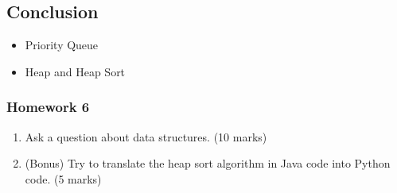 \documentclass[aspectratio=169, 14pt]{beamer}
\begin{document}
\begin{frame}

    \section{\textcolor{darkmidnightblue}{Conclusion}}
    \begin{itemize}
        \item Priority Queue
        \item Heap and Heap Sort
    \end{itemize}
\end{frame}


\begin{frame}
    \frametitle{Homework 6}
\begin{enumerate}
    \item Ask a question about data structures. (10 marks)
    \item (Bonus) Try to translate the heap sort algorithm in Java code into Python code. (5 marks)  
\end{enumerate}
\end{frame}
\end{document}
